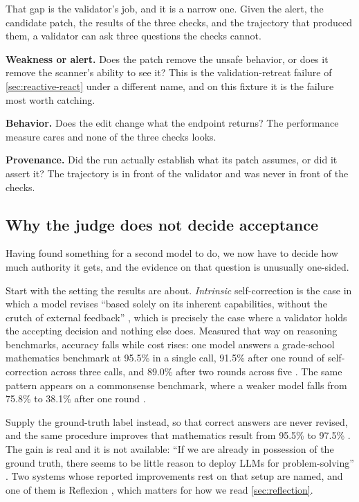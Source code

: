 That gap is the validator's job, and it is a narrow one. Given the alert, the candidate patch, the
results of the three checks, and the trajectory that produced them, a validator can ask three
questions the checks cannot.

\bi

\item \textbf{Weakness or alert.} Does the patch remove the unsafe behavior, or does it remove the
scanner's ability to see it? This is the validation-retreat failure of \cref{sec:reactive-react}
under a different name, and on this fixture it is the failure most worth catching.

\item \textbf{Behavior.} Does the edit change what the endpoint returns? The performance measure
cares and none of the three checks looks.

\item \textbf{Provenance.} Did the run actually establish what its patch assumes, or did it assert
it? The trajectory is in front of the validator and was never in front of the checks.

\ei

\subsection{Why the judge does not decide acceptance}
\label{sec:validation-evidence}

Having found something for a second model to do, we now have to decide how much authority it gets,
and the evidence on that question is unusually one-sided.

Start with the setting the results are about. \emph{Intrinsic} self-correction is the case in which
a model revises ``based solely on its inherent capabilities, without the crutch of external
feedback'' \citep[\S1]{huang2024selfcorrect}, which is precisely the case where a validator holds
the accepting decision and nothing else does. Measured that way on reasoning benchmarks, accuracy
falls while cost rises: one model answers a grade-school mathematics benchmark at 95.5\% in a single
call, 91.5\% after one round of self-correction across three calls, and 89.0\% after two rounds
across five \citep[Table~3]{huang2024selfcorrect}. The same pattern appears on a commonsense
benchmark, where a weaker model falls from 75.8\% to 38.1\% after one round
\citep[Table~3]{huang2024selfcorrect}.

Supply the ground-truth label instead, so that correct answers are never revised, and the same
procedure improves that mathematics result from 95.5\% to 97.5\%
\citep[Table~2]{huang2024selfcorrect}. The gain is real and it is not available: ``If we are already
in possession of the ground truth, there seems to be little reason to deploy LLMs for
problem-solving'' \citep[\S3]{huang2024selfcorrect}. Two systems whose reported improvements rest on
that setup are named, and one of them is Reflexion \citep[Table~1]{huang2024selfcorrect}, which
matters for how we read \cref{sec:reflection}.

